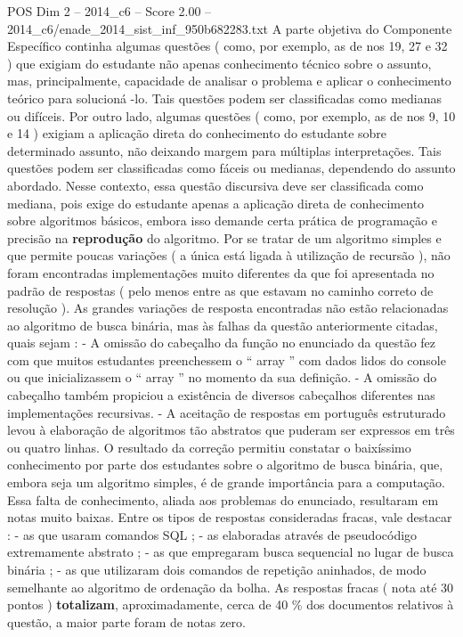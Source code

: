 \begin{textsample}{POS Dim 2 – 2014\_c6 – Score 2.00 – 2014\_c6/enade\_2014\_sist\_inf\_950b682283.txt}
A parte objetiva do Componente Específico continha algumas questões ( como, por exemplo, as de nos 19, 27 e 32 ) que exigiam do estudante não apenas conhecimento técnico sobre o assunto, mas, principalmente, capacidade de analisar o problema e aplicar o conhecimento teórico para solucioná -lo.
Tais questões podem ser classificadas como medianas ou difíceis.
Por outro lado, algumas questões ( como, por exemplo, as de nos 9, 10 e 14 ) exigiam a aplicação direta do conhecimento do estudante sobre determinado assunto, não deixando margem para múltiplas interpretações.
Tais questões podem ser classificadas como fáceis ou medianas, dependendo do assunto abordado.
Nesse contexto, essa questão discursiva deve ser classificada como mediana, pois exige do estudante apenas a aplicação direta de conhecimento sobre algoritmos básicos, embora isso demande certa prática de programação e precisão na \textbf{reprodução} do algoritmo.
Por se tratar de um algoritmo simples e que permite poucas variações ( a única está ligada à utilização de recursão ), não foram encontradas implementações muito diferentes da que foi apresentada no padrão de respostas ( pelo menos entre as que estavam no caminho correto de resolução ).
As grandes variações de resposta encontradas não estão relacionadas ao algoritmo de busca binária, mas às falhas da questão anteriormente citadas, quais sejam : - A omissão do cabeçalho da função no enunciado da questão fez com que muitos estudantes preenchessem o “ array ” com dados lidos do console ou que inicializassem o “ array ” no momento da sua definição. - A omissão do cabeçalho também propiciou a existência de diversos cabeçalhos diferentes nas implementações recursivas. - A aceitação de respostas em português estruturado levou à elaboração de algoritmos tão abstratos que puderam ser expressos em três ou quatro linhas.
O resultado da correção permitiu constatar o baixíssimo conhecimento por parte dos estudantes sobre o algoritmo de busca binária, que, embora seja um algoritmo simples, é de grande importância para a computação.
Essa falta de conhecimento, aliada aos problemas do enunciado, resultaram em notas muito baixas.
Entre os tipos de respostas consideradas fracas, vale destacar : - as que usaram comandos SQL ; - as elaboradas através de pseudocódigo extremamente abstrato ; - as que empregaram busca sequencial no lugar de busca binária ; - as que utilizaram dois comandos de repetição aninhados, de modo semelhante ao algoritmo de ordenação da bolha.
As respostas fracas ( nota até 30 pontos ) \textbf{totalizam}, aproximadamente, cerca de 40 \% dos documentos relativos à questão, a maior parte foram de notas zero.

\end{textsample}
